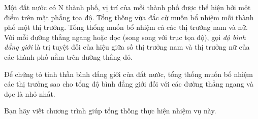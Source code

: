 Một đất nước có N thành phố, vị trí của mỗi thành phố được thể hiện bởi một điểm trên mặt phẳng tọa độ. Tổng thống vừa đắc cử muốn bổ nhiệm mỗi thành phố một thị trưởng. Tổng thổng muốn bổ nhiệm cả các thị trưởng nam và nữ. Với mỗi đường thẳng ngang hoặc dọc (song song với trục tọa độ), gọi \emph{ độ bình đẳng giới } là trị tuyệt đối của hiệu giữa số thị trưởng nam và thị trưởng nữ của các thành phố nằm trên đường thẳng đó.

Để chứng tỏ tinh thần bình đẳng giới của đất nước, tổng thống muốn bổ nhiệm các thị trưởng sao cho tổng độ bình đẳng giới đối với các đường thẳng ngang và dọc là nhỏ nhất.

Bạn hãy viết chương trình giúp tổng thống thực hiện nhiệm vụ này.